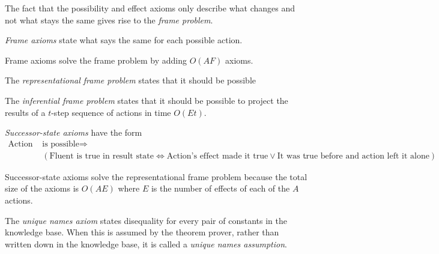 \documentclass{article}
\begin{document}
\begin{definition}
    The fact that the possibility and effect axioms only describe what changes
    and not what stays the same gives rise to the \emph{frame problem}.
\end{definition}

\begin{definition}
    \emph{Frame axioms} state what says the same for each possible action.
\end{definition}

\begin{theorem}
    Frame axioms solve the frame problem by adding $O(AF)$ axioms.
\end{theorem}

\begin{definition}
    The \emph{representational frame problem} states that it should be possible
\end{definition}

\begin{definition}
    The \emph{inferential frame problem} states that it should be 
    possible to project the results of a $t$-step sequence of actions
    in time $O(Et)$.
\end{definition}

\begin{definition}
    \emph{Successor-state axioms} have the form
    \begin{align*}
        \text{Action } &\text{is possible} \Rightarrow\\
        &(\text{Fluent is true in result state} \Leftrightarrow
        \text{Action's effect made it true}\vee \text{It was true before
        and action left it alone}).
    \end{align*}
\end{definition}

\begin{theorem}
    Successor-state axioms solve the representational frame problem
    because the total size of the axioms is $O(AE)$ where $E$ is the
    number of effects of each of the $A$ actions.
\end{theorem}

\begin{definition}
    The \emph{unique names axiom} states disequality for every pair of
    constants in the knowledge base. When this is assumed by the theorem
    prover, rather than written down in the knowledge base, it is called
    a \emph{unique names assumption}.
\end{definition}
\end{document}

